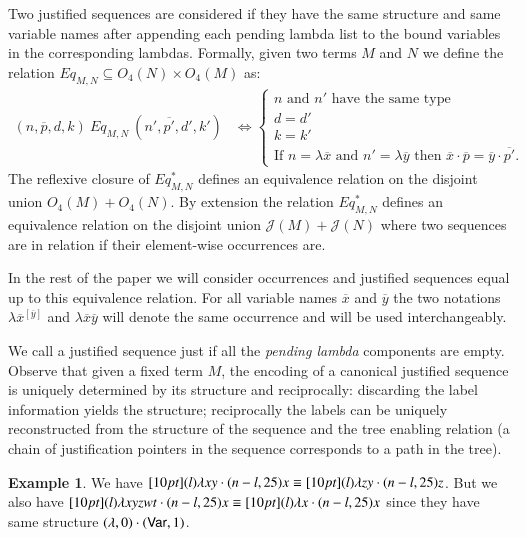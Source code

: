\documentclass{elsarticle}
\theoremstyle{plain}
\theoremstyle{definition}
\newtheorem{example}{Example}[section]
\theoremstyle{remark}
\def\justseqset{\mathcal{J}}
\begin{document}
Two justified sequences are considered  if they have the same structure and same variable names after appending each pending lambda list to the bound variables in the corresponding lambdas. Formally, given two terms $M$ and $N$ we define the relation
$Eq_{M,N} \subseteq O_4(N) \times O_4(M)$ as:
\begin{align*}
(n,\overline{p},d,k)~Eq_{M,N}~(n',\overline{p'},d',k') &\iff
\begin{cases}
    n \mbox{ and $n'$ have the same type} \\
    d = d' \\
    k = k' \\
    \mbox{If $n=\lambda\overline{x}$ and $n'=\lambda\overline{y}$ then
        $\overline{x} \cdot \overline{p} = \overline{y} \cdot \overline{p'}$.
    }
\end{cases}
\end{align*}
The reflexive closure of $Eq_{M,N}^*$ defines an equivalence relation on
 the disjoint union $O_4(M) + O_4(N)$. By extension the relation $Eq_{M,N}^*$ defines an equivalence relation on the disjoint union $\justseqset(M) + \justseqset(N)$ where two sequences are in relation if their element-wise occurrences are.

In the rest of the paper we will consider occurrences and justified sequences equal up to this equivalence relation. For all variable names $\overline{x}$ and $\overline{y}$ the two notations $\lambda\overline{x}^{[\overline{y}]}$ and $\lambda\overline{x}\overline{y}$ will denote the same occurrence and will be used interchangeably.

We call a justified sequence  just if all the \emph{pending lambda} components are empty. Observe that given a fixed term $M$, the encoding of a canonical justified sequence is uniquely determined by its structure and reciprocally: discarding the label information yields the structure; reciprocally the labels can be uniquely reconstructed from the structure of the sequence and the tree enabling relation (a chain of justification pointers in the sequence corresponds to a path in the tree).

\begin{example}
We have $\Pstr[10pt]{ (l){\lambda x y} \cdot (n-l,25){x} } \equiv \Pstr[10pt]{ (l){\lambda z y} \cdot (n-l,25){z}}$. But we also have $\Pstr[10pt]{ (l){\lambda x y z w t} \cdot (n-l,25){x} } \equiv \Pstr[10pt]{ (l){\lambda x} \cdot (n-l,25){x}}$ since they have same structure $(\lambda,0)\cdot({\sf Var},1)$.
\end{example}
\end{document}
